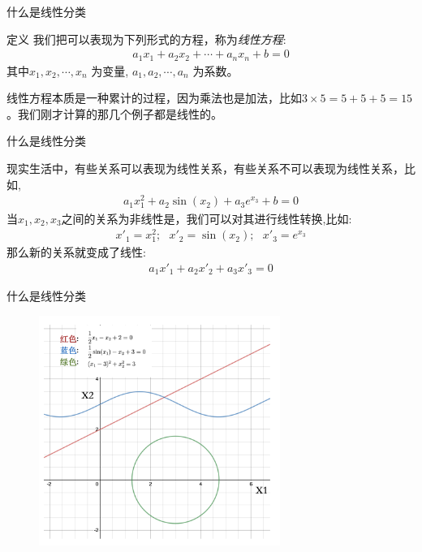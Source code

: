\documentclass[handout]{beamer}
\begin{document}
\begin{frame}{什么是线性分类}
	\begin{block}{定义}
	我们把可以表现为下列形式的方程，称为\textit{线性方程}:
	\begin{align*}
		a_1 x_1 + a_2 x_2 + \cdots + a_n x_n + b = 0
	\end{align*}
	其中$x_1, x_2, \cdots, x_n$ 为变量, $a_1, a_2, \cdots, a_n$ 为系数。
\end{block}
线性方程本质是一种累计的过程，因为乘法也是加法，比如$3 \times 5 = 5 + 5 + 5 = 15$。我们刚才计算的那几个例子都是线性的。
\end{frame}

\begin{frame}{什么是线性分类}
	\begin{example}
现实生活中，有些关系可以表现为线性关系，有些关系不可以表现为线性关系，比如,
\begin{align*}
	a_1 x_1^2 + a_2 \sin (x_2) + a_3 e^{x_3} + b  = 0 
\end{align*}	
当$x_1, x_2, x_3$之间的关系为非线性是，我们可以对其进行线性转换,比如:
\begin{align*}
	x'_1 = x_1^2; \ \ \ x'_2 = \sin (x_2); \ \ \ x'_3 = e^{x_3}
\end{align*}
那么新的关系就变成了线性: 
\begin{align*}
	a_1 x'_1 + a_2 x'_2 + a_3 x'_3 = 0 
\end{align*}
\end{example}
\end{frame}

\begin{frame}{什么是线性分类}
\begin{figure}[H]
	\centering
	\includegraphics[width=0.7\textwidth]{fig/C2C2linear}
\end{figure}	
\end{frame}
\end{document}
